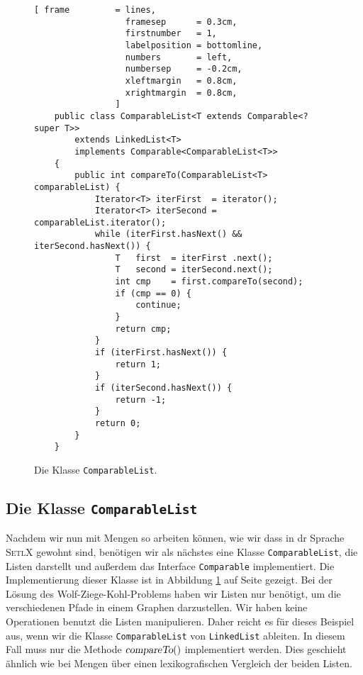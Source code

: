 \begin{figure}[!ht]
\centering
\begin{Verbatim}[ frame         = lines, 
                  framesep      = 0.3cm, 
                  firstnumber   = 1,
                  labelposition = bottomline,
                  numbers       = left,
                  numbersep     = -0.2cm,
                  xleftmargin   = 0.8cm,
                  xrightmargin  = 0.8cm,
                ]
    public class ComparableList<T extends Comparable<? super T>> 
        extends LinkedList<T>
        implements Comparable<ComparableList<T>>
    {
        public int compareTo(ComparableList<T> comparableList) { 
            Iterator<T> iterFirst  = iterator();
            Iterator<T> iterSecond = comparableList.iterator();
            while (iterFirst.hasNext() && iterSecond.hasNext()) {
                T   first  = iterFirst .next();
                T   second = iterSecond.next();
                int cmp    = first.compareTo(second);
                if (cmp == 0) {
                    continue;
                }
                return cmp;
            }
            if (iterFirst.hasNext()) {
                return 1;
            }       
            if (iterSecond.hasNext()) {
                return -1;
            }
            return 0;
        }
    }
\end{Verbatim}
\vspace*{-0.3cm}
\caption{Die Klasse \texttt{ComparableList}.}
\label{fig:ComparableList.java}
\end{figure}

\subsection{Die Klasse \texttt{ComparableList}}
Nachdem wir nun mit Mengen so arbeiten k\"onnen, wie wir dass in dr Sprache \textsc{SetlX} gewohnt sind,
ben\"otigen wir als n\"achstes eine Klasse \texttt{ComparableList}, die Listen darstellt und au\ss{}erdem das
Interface \texttt{Comparable} implementiert.  Die Implementierung dieser Klasse ist in Abbildung
\ref{fig:ComparableList.java} auf Seite \pageref{fig:ComparableList.java} gezeigt.  Bei der L\"osung des
Wolf-Ziege-Kohl-Problems haben wir Listen nur ben\"otigt, um die verschiedenen Pfade in einem Graphen
darzustellen.  Wir haben keine Operationen benutzt die Listen manipulieren.  Daher reicht es f\"ur dieses
Beispiel aus, wenn wir die Klasse \texttt{ComparableList} von \texttt{LinkedList} ableiten.  In diesem
Fall muss nur die Methode $\textsl{compareTo}()$ implementiert werden.  Dies geschieht \"ahnlich wie bei
Mengen \"uber einen lexikografischen Vergleich der beiden Listen.

